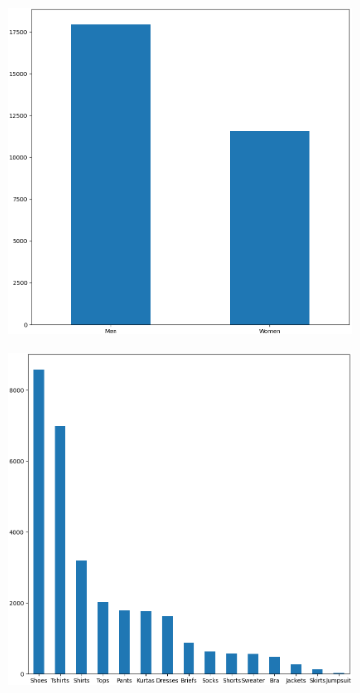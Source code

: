\begin{figure}[H]
	\centering
	\begin{subfigure}[c]{0.32\linewidth}
		\includegraphics[width=\linewidth]{images/gender.png}
	\end{subfigure}
	\begin{subfigure}[c]{0.32\linewidth}
		\includegraphics[width=\linewidth]{images/articleType.png}

\end{subfigure}
\end{figure}

